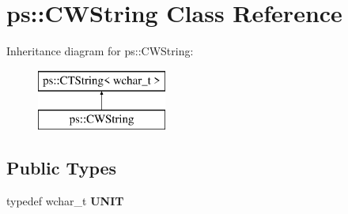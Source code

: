 \hypertarget{classps_1_1CWString}{}\section{ps\+:\+:C\+W\+String Class Reference}
\label{classps_1_1CWString}
Inheritance diagram for ps\+:\+:C\+W\+String\+:\begin{figure}[H]
\begin{center}
\leavevmode
\includegraphics[height=2.000000cm]{classps_1_1CWString}
\end{center}
\end{figure}
\subsection*{Public Types}
\begin{DoxyCompactItemize}
\item 
\hypertarget{classps_1_1CWString_a918338801b1f6ff0d04c4f38c2011b78}{}typedef wchar\+\_\+t {\bfseries U\+N\+I\+T}\label{classps_1_1CWString_a918338801b1f6ff0d04c4f38c2011b78}

\end{DoxyCompactItemize}
